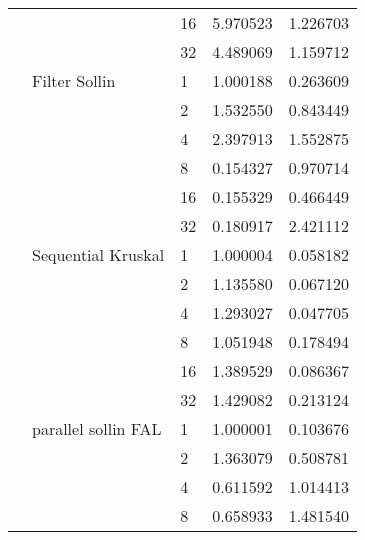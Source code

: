 \begin{tabular}{lllrr}
                                                       &                     & 16 &  5.970523 &  1.226703 \\
                                                       &                     & 32 &  4.489069 &  1.159712 \\
                                                       & Filter Sollin & 1  &  1.000188 &  0.263609 \\
                                                       &                     & 2  &  1.532550 &  0.843449 \\
                                                       &                     & 4  &  2.397913 &  1.552875 \\
                                                       &                     & 8  &  0.154327 &  0.970714 \\
                                                       &                     & 16 &  0.155329 &  0.466449 \\
                                                       &                     & 32 &  0.180917 &  2.421112 \\
                                                       & Sequential Kruskal & 1  &  1.000004 &  0.058182 \\
                                                       &                     & 2  &  1.135580 &  0.067120 \\
                                                       &                     & 4  &  1.293027 &  0.047705 \\
                                                       &                     & 8  &  1.051948 &  0.178494 \\
                                                       &                     & 16 &  1.389529 &  0.086367 \\
                                                       &                     & 32 &  1.429082 &  0.213124 \\
                                                       & parallel sollin FAL & 1  &  1.000001 &  0.103676 \\
                                                       &                     & 2  &  1.363079 &  0.508781 \\
                                                       &                     & 4  &  0.611592 &  1.014413 \\
                                                       &                     & 8  &  0.658933 &  1.481540 \\

\end{tabular}
